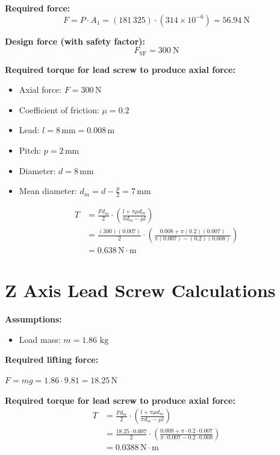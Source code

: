\noindent\textbf{Required force:}
\[
F = P \cdot A_1 = (181\,325)\cdot(314 \times 10^{-6}) = \SI{56.94}{\newton}
\]

\noindent\textbf{Design force (with safety factor):}
\[
F_{\text{SF}} = \SI{300}{\newton}
\]

\noindent\textbf{Required torque for lead screw to produce axial force:}
\begin{itemize}
  \item Axial force: \( F = 300\,\text{N} \)
  \item Coefficient of friction: \( \mu = 0.2 \)
  \item Lead: \( l = 8\,\text{mm} = 0.008\,\text{m} \)
  \item Pitch: \(p=2\,\text{mm}\)
  \item Diameter: \(d=8\,\text{mm}\)
  \item Mean diameter: \( d_m = d-\frac{p}{2} = 7\,\text{mm}\)
\end{itemize}


\begin{align*}
T &= \frac{F d_m}{2} \cdot \left( \frac{l + \pi \mu d_m}{\pi d_m - \mu l} \right) \\
  &= \frac{(300)(0.007)}{2} \cdot \left( \frac{0.008 + \pi(0.2)(0.007)}{\pi(0.007) - (0.2)(0.008)} \right) \\
  &= 0.638\,\text{N}\cdot\text{m}
\end{align*}


\section{Z Axis Lead Screw Calculations}

\textbf{Assumptions:}
\begin{itemize}
  \item Load mass: \( m = 1.86\,\,\text{kg} \)
\end{itemize}

\noindent\textbf{Required lifting force:}  

\( F = mg = 1.86 \cdot 9.81 = 18.25\,\text{N} \)

\noindent\textbf{Required torque for lead screw to produce axial force:}
\begin{align*}
T &= \frac{F d_m}{2} \cdot \left( \frac{l + \pi \mu d_m}{\pi d_m - \mu l} \right) \\
  &= \frac{18.25 \cdot 0.007}{2} \cdot \left( \frac{0.008 + \pi \cdot 0.2 \cdot 0.007}{\pi \cdot 0.007 - 0.2 \cdot 0.008} \right) \\
  &= 0.0388\,\text{N}\cdot\text{m}
\end{align*}


